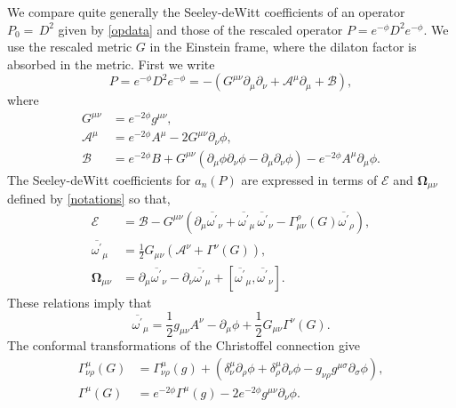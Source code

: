 \documentclass[12pt]{article}%
\begin{document}
We compare quite generally the Seeley-deWitt coefficients of an operator
$P_{0}=\,D^{2}$ given by \eqref{opdata} and those of the rescaled operator
$P=e^{-\phi}D^{2}e^{-\phi}$. We use the rescaled metric $G$ in the Einstein
frame, where the dilaton factor is absorbed in the metric. First we write%
\begin{equation}
\label{opdatanew}P=e^{-\phi}D^{2}e^{-\phi}=-\left(  G^{\mu\nu}\partial_{\mu
}\partial_{\nu}+\mathcal{A}^{\mu}\partial_{\mu}+\mathcal{B}\right)  ,
\end{equation}
where
\begin{align*}
G^{\mu\nu}  &  =e^{-2\phi}g^{\mu\nu},\\
\mathcal{A}^{\mu}  &  =e^{-2\phi}A^{\mu}-2G^{\mu\nu}\partial_{\nu}\phi,\\
\mathcal{B}  &  =e^{-2\phi}B+G^{\mu\nu}\left(  \partial_{\mu}\phi\partial
_{\nu}\phi-\partial_{\mu}\partial_{\nu}\phi\right)  -e^{-2\phi}A^{\mu}%
\partial_{\mu}\phi.
\end{align*}
The Seeley-deWitt coefficients for $a_{n}\left(  P\right)  $ are expressed in
terms of $\mathcal{E}$ and $\mathbf{\Omega}_{\mu\nu}$ defined by
\eqref{notations} so that,
\begin{align*}
\mathcal{E}  &  =\mathcal{B}-G^{\mu\nu}\left(  \partial_{\mu}\overline
{\omega^{\prime}}_{\nu}+\overline{\omega^{\prime}}_{\mu}\overline
{\,\omega^{\prime}}_{\nu}-\Gamma_{\mu\nu}^{\rho}\left(  G\right)
\overline{\omega^{\prime}}_{\rho}\right)  ,\\
\overline{\omega^{\prime}}_{\mu}  &  =\frac{1}{2}G_{\mu\nu}\left(
\mathcal{A}^{\nu}+\Gamma^{\nu}\left(  G\right)  \right)  ,\\
\mathbf{\Omega}_{\mu\nu}  &  =\partial_{\mu}\overline{\omega^{\prime}}_{\nu
}-\partial_{\nu}\overline{\omega^{\prime}}_{\mu}+\left[  \overline
{\omega^{\prime}}_{\mu},\overline{\omega^{\prime}}_{\nu}\right]  .
\end{align*}
These relations imply that
\[
\overline{\omega^{\prime}}_{\mu}=\frac{1}{2}g_{\mu\nu}A^{\nu}-\partial_{\mu
}\phi+\frac{1}{2}G_{\mu\nu}\Gamma^{\nu}\left(  G\right)  .
\]
The conformal transformations of the Christoffel connection give%
\begin{align*}
\Gamma_{\nu\rho}^{\mu}\left(  G\right)   &  =\Gamma_{\nu\rho}^{\mu}\left(
g\right)  +\left(  \delta_{\nu}^{\mu}\partial_{\rho}\phi+\delta_{\rho}^{\mu
}\partial_{\nu}\phi-g_{\nu\rho}g^{\mu\sigma}\partial_{\sigma}\phi\right)  ,\\
\Gamma^{\mu}\left(  G\right)   &  =e^{-2\phi}\Gamma^{\mu}\left(  g\right)
-2e^{-2\phi}g^{\mu\nu}\partial_{\nu}\phi.
\end{align*}
\end{document}
